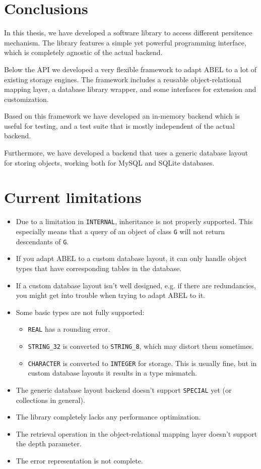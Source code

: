 \section{Conclusions}

In this thesis, we have developed a software library to access different persitence mechanism.
The library features a simple yet powerful programming interface, which is completely agnostic of the actual backend.

Below the API we developed a very flexible framework to adapt ABEL to a lot of existing storage engines.
The framework includes a reusable object-relational mapping layer, a database library wrapper, and some interfaces for extension and customization.

Based on this framework we have developed an in-memory backend which is useful for testing, and a test suite that is mostly independent of the actual backend.

Furthermore, we have developed a backend that uses a generic data\-base layout for storing objects, working both for MySQL and SQLite data\-bases.

\section{Current limitations}

\begin{itemize}
\item Due to a limitation in \lstinline!INTERNAL!, inheritance is not properly supported.
This especially means that a query of an object of class \lstinline!G! will not return descendants of \lstinline!G!.
\item If you adapt ABEL to a custom database layout, it can only handle object types that have corresponding tables in the database.
\item If a custom database layout isn't well designed, e.g. if there are redundancies, you might get into trouble when trying to adapt ABEL to it.
\item Some basic types are not fully supported:
\begin{itemize}
	\item \lstinline!REAL! has a rounding error.
	\item \lstinline!STRING_32! is converted to \lstinline!STRING_8!, which may distort them sometimes.
	\item \lstinline!CHARACTER! is converted to \lstinline!INTEGER! for storage.
	This is usually fine, but in custom database layouts it results in a type mismatch.
\end{itemize}
\item The generic database layout backend doesn't support \lstinline!SPECIAL! yet (or collections in general).
\item The library completely lacks any performance optimization.
\item The retrieval operation in the object-relational mapping layer doesn't support the depth parameter.
\item The error representation is not complete.
\end{itemize}

